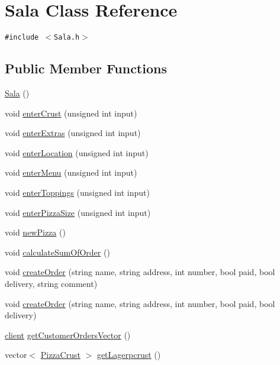 \hypertarget{class_sala}{
\section{Sala Class Reference}
\label{class_sala}
}
{\tt \#include $<$Sala.h$>$}

\subsection*{Public Member Functions}
\begin{CompactItemize}
\item 
\hyperlink{class_sala_da283dd136f3f0c2703d0356f49c1e6e}{Sala} ()
\item 
void \hyperlink{class_sala_ae3b8375ca0ab5b62e84f86582b8cec3}{enter\-Crust} (unsigned int input)
\item 
void \hyperlink{class_sala_f4637151f3f934bdf727685020e956e2}{enter\-Extras} (unsigned int input)
\item 
void \hyperlink{class_sala_d5b546b927926e2eed280fcdc087135e}{enter\-Location} (unsigned int input)
\item 
void \hyperlink{class_sala_1015bfdd699f9dc90a677a87def0b37b}{enter\-Menu} (unsigned int input)
\item 
void \hyperlink{class_sala_34479ade70e563ba9c7eb9b66df2270e}{enter\-Toppings} (unsigned int input)
\item 
void \hyperlink{class_sala_caeeb8aada209ebb8bde4749b2ececdc}{enter\-Pizza\-Size} (unsigned int input)
\item 
void \hyperlink{class_sala_eadce54d849ca6634b7fdd389bd8f192}{new\-Pizza} ()
\item 
void \hyperlink{class_sala_24b9bb5302a251b41fed3df1fb7ce8ad}{calculate\-Sum\-Of\-Order} ()
\item 
void \hyperlink{class_sala_554463c0b82fb266c21e23e040bf1ac0}{create\-Order} (string name, string address, int number, bool paid, bool delivery, string comment)
\item 
void \hyperlink{class_sala_9f3c48158017cdc015a985e9712f0179}{create\-Order} (string name, string address, int number, bool paid, bool delivery)
\item 
\hyperlink{classclient}{client} \hyperlink{class_sala_3a31e5a83058a950f863932d3ecaef2e}{get\-Customer\-Orders\-Vector} ()
\item 
vector$<$ \hyperlink{class_pizza_crust}{Pizza\-Crust} $>$ \hyperlink{class_sala_85a631cad1f4009e87de7da3bc52174c}{get\-Lagerpcrust} ()
\item 

\end{CompactItemize}
